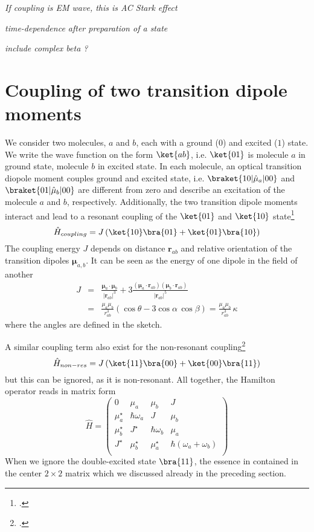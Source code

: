 \textit{If coupling is EM wave, this is AC Stark effect}

\textit{time-dependence after preparation of a state}

\textit{include complex beta ?}


\section{Coupling of two transition dipole moments}


We consider two molecules, $a$ and $b$, each with a ground ($0$) and excited ($1$) state. We write the wave function on the form $\ket{ab}$, i.e. $\ket{01}$ is molecule $a$ in ground state, molecule $b$ in excited state. In each molecule, an optical transition diopole moment couples ground and excited state, i.e. $\braket{10| \hat{\mu}_a | 00}$ and $\braket{01| \hat{\mu}_b | 00}$ are different from zero and describe an excitation of the molecule  $a$ and $b$, respectively. Additionally, the two transition dipole moments interact and lead to a resonant coupling of the 
$\ket{01}$ and $\ket{10}$ state\footcite{knoester-book}
\[
\hat{H}_{coupling} = J \left(  \ket{10}\bra{01} + \ket{01}\bra{10}  \right)
\]
The coupling energy $J$ depends on distance $\boldsymbol{r}_{ab}$ and relative orientation of the transition dipoles $\boldsymbol{\mu}_{a,b}$. It can be seen as the energy of one dipole in the field of another
\begin{eqnarray*}
 J & = & \frac{\boldsymbol{\mu}_a \cdot  \boldsymbol{\mu}_b }{|\boldsymbol{r}_{ab}|^3} 
  + 3 \frac{ (\boldsymbol{\mu}_a \cdot  \boldsymbol{r}_{ab})  (\boldsymbol{\mu}_b \cdot  \boldsymbol{r}_{ab})
  }{ |\boldsymbol{r}_{ab}|^5 } \\
   & = & \frac{\mu_a \mu_b }{r_{ab}^3} \left( \cos \theta - 3 \cos \alpha \, \cos \beta \right)  = \frac{\mu_a \mu_b }{r_{ab}^3} \, \kappa
\end{eqnarray*}
where the angles are defined in the sketch.


A similar coupling term also exist for the non-resonant coupling\footcite{knoester-book}
\[
\hat{H}_{non-res} = J \left(  \ket{11}\bra{00} + \ket{00}\bra{11}  \right)
\]
but this can be ignored, as it is non-resonant. All together, the Hamilton operator reads in matrix form
\[
\hat{H} = \begin{pmatrix}
0   					& \mu_a 						&	\mu_b						& 		J 		\\
\mu_a^\star	& \hbar \omega_a		&	J								& \mu_b	\\
\mu_b^\star  &  J^\star					& \hbar \omega_b		& \mu_a	\\
J^\star				& \mu_b^\star			& \mu_a^\star			& \hbar (\omega_a + \omega_b) \\
\end{pmatrix}
\]
When we ignore the double-excited state $\bra{11}$, the essence in contained in the center $2 \times 2$ matrix which we discussed already in the preceding section.

